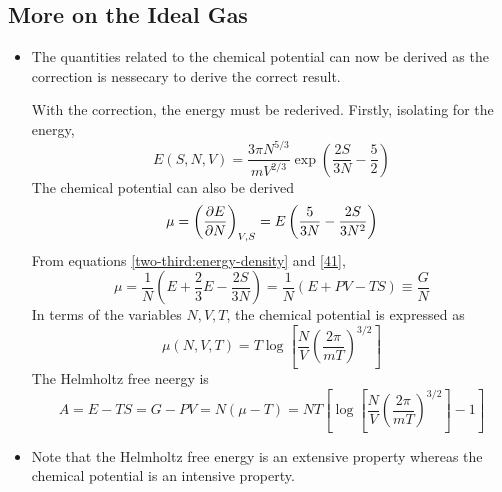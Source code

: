 \documentclass{article}
\begin{document}
\subsection{More on the Ideal Gas}
\begin{itemize}
    \item The quantities related to the chemical potential can now be derived as the correction is nessecary to derive the correct result. 
    \begin{derivation}
        With the correction, the energy must be rederived. Firstly, isolating for the energy,
        \begin{equation}
            E(S,N,V)=\frac{3\pi N^{5/3}}{mV^{2/3}}\exp\left(\frac{2S}{3N}-\frac{5}{2}\right)
        \end{equation}
        The chemical potential can also be derived
        \begin{equation}
            \mu=\left(\partialderivative{E}{N}\right)_{V,S}=E\left(\frac{5}{3N}-\frac{2S}{3N^2}\right)
        \end{equation}
        From equations \eqref{two-third:energy-density} and \eqref{41},
        \begin{equation}
            \mu=\frac{1}{N}\left(E+\frac{2}{3}E-\frac{2S}{3N}\right)=\frac{1}{N}(E+PV-TS)\equiv\frac{G}{N}
        \end{equation}
        In terms of the variables $N,V,T$, the chemical potential is expressed as
        \begin{equation}
            \mu(N,V,T)=T\log\left[\frac{N}{V}\left(\frac{2\pi}{mT}\right)^{3/2}\right]
        \end{equation}
        The Helmholtz free neergy is 
        \begin{equation}
            A=E-TS=G-PV=N(\mu-T)=NT\left[\log\left[\frac{N}{V}\left(\frac{2\pi}{mT}\right)^{3/2}\right]-1\right]
        \end{equation}
    \end{derivation}
    \item Note that the Helmholtz free energy is an extensive property whereas the chemical potential is an intensive property.
\end{itemize}
\end{document}
